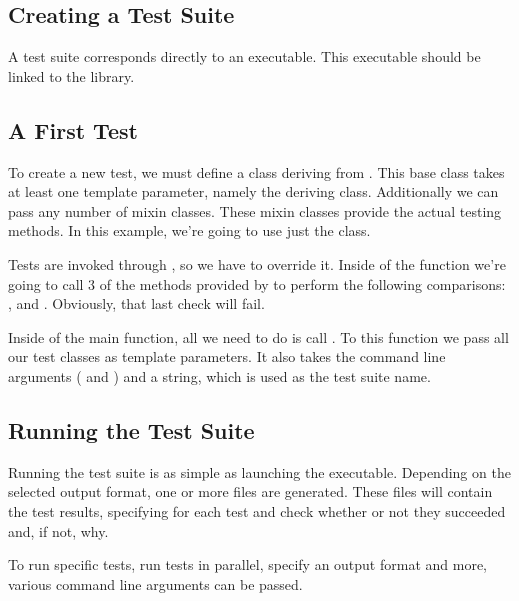\subsection{Creating a Test Suite}
\label{section:guide:testsuite}

A test suite corresponds directly to an executable. This executable should be linked to the  library.

\subsection{A First Test}
\label{section:guide:firsttest}

To create a new test, we must define a class deriving from . This base class takes at least one template parameter, namely the deriving class. Additionally we can pass any number of mixin classes. These mixin classes provide the actual testing methods. In this example, we're going to use just the  class.

Tests are invoked through , so we have to override it. Inside of the function we're going to call 3 of the methods provided by  to perform the following comparisons: ,  and  . Obviously, that last check will fail.

Inside of the main function, all we need to do is call . To this function we pass all our test classes as template parameters. It also takes the command line arguments ( and ) and a string, which is used as the test suite name.



\subsection{Running the Test Suite}
\label{section:guide:run}

Running the test suite is as simple as launching the executable. Depending on the selected output format, one or more files are generated. These files will contain the test results, specifying for each test and check whether or not they succeeded and, if not, why.

To run specific tests, run tests in parallel, specify an output format and more, various command line arguments can be passed.

